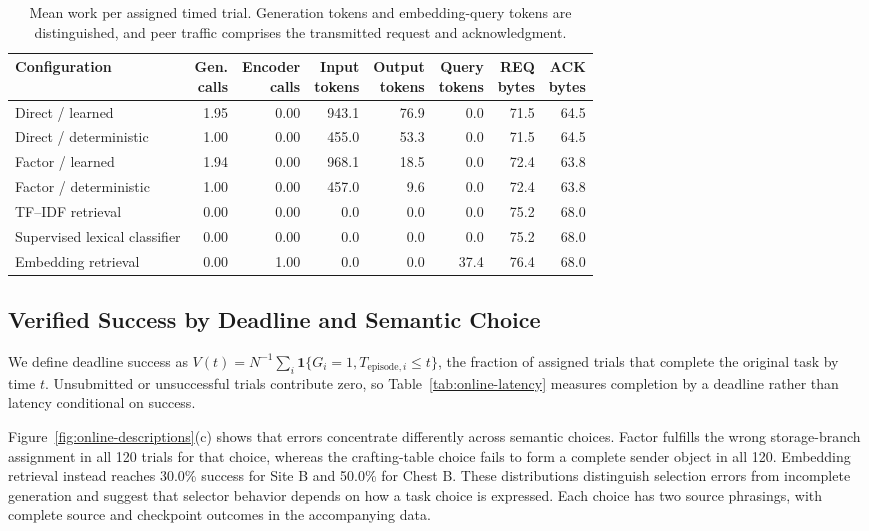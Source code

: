 \documentclass[sigconf,nonacm,balance=false]{aamas}
\newcommand{\tabstyle}{\small\setlength{\tabcolsep}{3pt}\renewcommand{\arraystretch}{1.10}}
\begin{document}
\begin{table}[!htbp]
\centering\tabstyle
\caption{Mean work per assigned timed trial. Generation tokens and embedding-query tokens are distinguished, and peer traffic comprises the transmitted request and acknowledgment.}
\label{tab:online-work}
\begin{tabular}{@{}lrrrrrrr@{}}
\toprule
Configuration & \shortstack{Gen.\\calls} & \shortstack{Encoder\\calls} & \shortstack{Input\\tokens} & \shortstack{Output\\tokens} & \shortstack{Query\\tokens} & \shortstack{REQ\\bytes} & \shortstack{ACK\\bytes}\\\midrule
Direct / learned & 1.95 & 0.00 & 943.1 & 76.9 & 0.0 & 71.5 & 64.5\\
Direct / deterministic & 1.00 & 0.00 & 455.0 & 53.3 & 0.0 & 71.5 & 64.5\\
Factor / learned & 1.94 & 0.00 & 968.1 & 18.5 & 0.0 & 72.4 & 63.8\\
Factor / deterministic & 1.00 & 0.00 & 457.0 & 9.6 & 0.0 & 72.4 & 63.8\\
TF--IDF retrieval & 0.00 & 0.00 & 0.0 & 0.0 & 0.0 & 75.2 & 68.0\\
Supervised lexical classifier & 0.00 & 0.00 & 0.0 & 0.0 & 0.0 & 75.2 & 68.0\\
Embedding retrieval & 0.00 & 1.00 & 0.0 & 0.0 & 37.4 & 76.4 & 68.0\\
\bottomrule\end{tabular}\end{table}

\subsection{Verified Success by Deadline and Semantic Choice}

We define deadline success as $V(t)=N^{-1}\sum_i\mathbf 1\{G_i=1,T_{\mathrm{episode},i}\leq t\}$, the fraction of assigned trials that complete the original task by time $t$. Unsubmitted or unsuccessful trials contribute zero, so Table~\ref{tab:online-latency} measures completion by a deadline rather than latency conditional on success.

Figure~\ref{fig:online-descriptions}(c) shows that errors concentrate differently across semantic choices. Factor fulfills the wrong storage-branch assignment in all 120 trials for that choice, whereas the crafting-table choice fails to form a complete sender object in all 120. Embedding retrieval instead reaches 30.0\% success for Site B and 50.0\% for Chest B. These distributions distinguish selection errors from incomplete generation and suggest that selector behavior depends on how a task choice is expressed. Each choice has two source phrasings, with complete source and checkpoint outcomes in the accompanying data.
\end{document}

